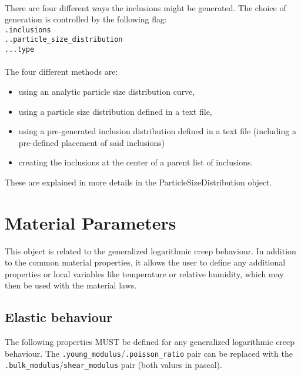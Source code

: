 \documentclass[10pt]{article}
\begin{document}
\paragraph{} There are four different ways the inclusions might be generated. The choice of generation is controlled by the following flag:\\
\verb+.inclusions+\\
\verb+..particle_size_distribution+\\
\verb+...type+

\paragraph{} The four different methods are:
\begin{itemize}
	\item using an analytic particle size distribution curve,
	\item using a particle size distribution defined in a text file,
	\item using a pre-generated inclusion distribution defined in a text file (including a pre-defined placement of said inclusions)
	\item creating the inclusions at the center of a parent list of inclusions.
\end{itemize}

These are explained in more details in the ParticleSizeDistribution object.

\section{Material Parameters}

This object is related to the generalized logarithmic creep behaviour. In addition to the common material properties, it allows the user to define any additional properties or local variables like temperature or relative humidity, which may then be used with the material laws.

\subsection{Elastic behaviour}

The following properties MUST be defined for any generalized logarithmic creep behaviour. The \verb+.young_modulus+/\verb+.poisson_ratio+ pair can be replaced with the \verb+.bulk_modulus+/\verb+shear_modulus+ pair (both values in pascal).\\
\end{document}
